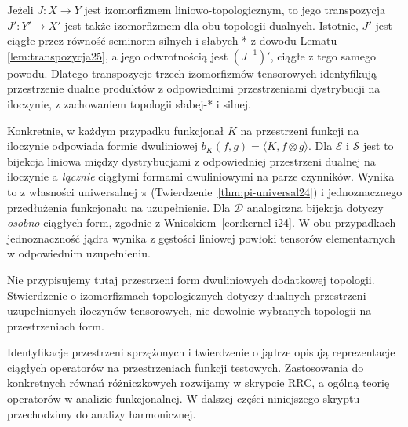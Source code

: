 \begin{uwaga}
\label{rem:kernel-summary25}
Jeżeli $J:X\to Y$ jest izomorfizmem liniowo-topologicznym,
to jego transpozycja $J':Y'\to X'$ jest także
izomorfizmem dla obu topologii dualnych.
Istotnie, $J'$ jest ciągłe przez równość seminorm
silnych i słabych-* z dowodu Lematu~
\ref{lem:transpozycja25}, a jego odwrotnością jest
$(J^{-1})'$, ciągłe z tego samego powodu.
Dlatego transpozycje trzech izomorfizmów tensorowych
identyfikują przestrzenie dualne produktów
z odpowiednimi przestrzeniami dystrybucji na
iloczynie, z zachowaniem topologii słabej-* i silnej.

Konkretnie, w każdym przypadku funkcjonał $K$
na przestrzeni funkcji na iloczynie odpowiada
formie dwuliniowej
$b_K(f,g)=\langle K,f\otimes g\rangle$.
Dla $\mathcal E$ i $\mathcal S$ jest to bijekcja
liniowa między dystrybucjami z odpowiedniej
przestrzeni dualnej na iloczynie a \emph{łącznie}
ciągłymi formami dwuliniowymi na parze czynników.
Wynika to z własności uniwersalnej $\pi$
(Twierdzenie~\ref{thm:pi-universal24}) i jednoznacznego
przedłużenia funkcjonału na uzupełnienie.
Dla $\mathcal D$ analogiczna bijekcja dotyczy
\emph{osobno} ciągłych form, zgodnie z
Wnioskiem~\ref{cor:kernel-i24}.
W obu przypadkach jednoznaczność jądra wynika
z gęstości liniowej powłoki tensorów elementarnych
w odpowiednim uzupełnieniu.

Nie przypisujemy tutaj przestrzeni form dwuliniowych
dodatkowej topologii. Stwierdzenie o izomorfizmach
topologicznych dotyczy dualnych przestrzeni
uzupełnionych iloczynów tensorowych, nie dowolnie
wybranych topologii na przestrzeniach form.
\end{uwaga}

\begin{uwaga}
\label{rem:future25}
Identyfikacje przestrzeni sprzężonych i twierdzenie o jądrze
opisują reprezentacje ciągłych operatorów na przestrzeniach
funkcji testowych. Zastosowania do konkretnych równań
różniczkowych rozwijamy w skrypcie RRC, a ogólną teorię
operatorów w analizie funkcjonalnej. W dalszej części
niniejszego skryptu przechodzimy do analizy harmonicznej.
\end{uwaga}
